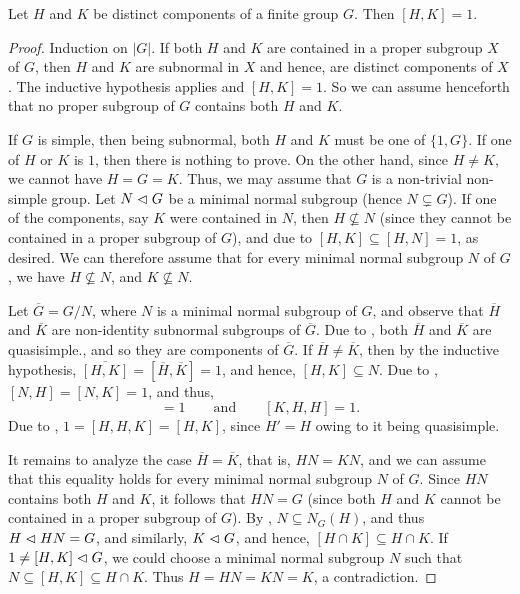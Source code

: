\begin{theorem}
    Let $H$ and $K$ be distinct components of a finite group $G$. Then $[H, K] = 1$.
\end{theorem}
\begin{proof}
    Induction on $|G|$. If both $H$ and $K$ are contained in a proper subgroup $X$ of $G$, then $H$ and $K$ are subnormal in $X$ and hence, are distinct components of $X$. The inductive hypothesis applies and $[H, K] = 1$. So we can assume henceforth that no proper subgroup of $G$ contains both $H$ and $K$.

    If $G$ is simple, then being subnormal, both $H$ and $K$ must be one of $\{1, G\}$. If one of $H$ or $K$ is $1$, then there is nothing to prove. On the other hand, since $H\ne K$, we cannot have $H = G = K$. Thus, we may assume that $G$ is a non-trivial non-simple group. Let $N\vartriangleleft G$ be a minimal normal subgroup (hence $N\subsetneq G$). If one of the components, say $K$ were contained in $N$, then $H\not\subseteq N$ (since they cannot be contained in a proper subgroup of $G$), and due to  $[H, K]\subseteq [H, N] = 1$, as desired. We can therefore assume that for every minimal normal subgroup $N$ of $G$, we have $H\not\subseteq N$, and $K\not\subseteq N$.

    Let $\overline G = G/N$, where $N$ is a minimal normal subgroup of $G$, and observe that $\overline H$ and $\overline K$ are non-identity subnormal subgroups of $\overline G$. Due to , both $\overline H$ and $\overline K$ are quasisimple., and so they are components of $\overline G$. If $\overline H\ne\overline K$, then by the inductive hypothesis, $\overline{[H, K]} = [\overline H,\overline K] = 1$, and hence, $[H, K]\subseteq N$. Due to , $[N, H] = [N, K] = 1$, and thus, 
    \begin{equation*}
        [H, K, H] = 1\qquad\text{and}\qquad[K, H, H] = 1.
    \end{equation*}
    Due to , $1 = [H, H, K] = [H, K]$, since $H' = H$ owing to it being quasisimple.

    It remains to analyze the case $\overline H = \overline K$, that is, $HN = KN$, and we can assume that this equality holds for every minimal normal subgroup $N$ of $G$. Since $HN$ contains both $H$ and $K$, it follows that $HN = G$ (since both $H$ and $K$ cannot be contained in a proper subgroup of $G$). By , $N\subseteq N_G(H)$, and thus $H\vartriangleleft HN = G$, and similarly, $K\vartriangleleft G$, and hence, $[H\cap K]\subseteq H\cap K$. If $1\ne [H, K]\vartriangleleft G$, we could choose a minimal normal subgroup $N$ such that $N\subseteq [H, K]\subseteq H\cap K$. Thus $H = HN = KN = K$, a contradiction.
\end{proof}

    
